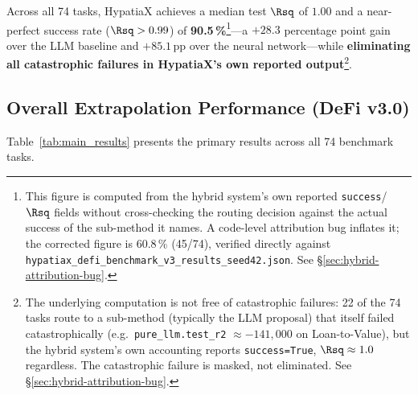
Across all 74 tasks, HypatiaX achieves a median test $\Rsq$ of $1.00$ and a
near-perfect success rate ($\Rsq>0.99$) of \textbf{90.5\,\%}\footnote{This
figure is computed from the hybrid system's own reported \texttt{success}/$\Rsq$
fields without cross-checking the routing decision against the actual success
of the sub-method it names. A code-level attribution bug inflates it; the
corrected figure is 60.8\,\% (45/74), verified directly against
\texttt{hypatiax\_defi\_benchmark\_v3\_results\_seed42.json}. See
\S\ref{sec:hybrid-attribution-bug}.}---a $+28.3$
percentage point gain over the LLM baseline and $+85.1$\,pp over the neural
network---while \textbf{eliminating all catastrophic failures in HypatiaX's
own reported output}\footnote{The underlying computation is not free of
catastrophic failures: 22 of the 74 tasks route to a sub-method (typically
the LLM proposal) that itself failed catastrophically (e.g.\
\texttt{pure\_llm.test\_r2} $\approx -141{,}000$ on Loan-to-Value), but the
hybrid system's own accounting reports \texttt{success=True},
$\Rsq \approx 1.0$ regardless. The catastrophic failure is masked, not
eliminated. See \S\ref{sec:hybrid-attribution-bug}.}.

\subsection{Overall Extrapolation Performance (DeFi v3.0)}\label{subsec:overall-extrapolation-performance-defi-v}
\label{sec:results_defi}

Table~\ref{tab:main_results} presents the primary results across all 74 benchmark tasks.

